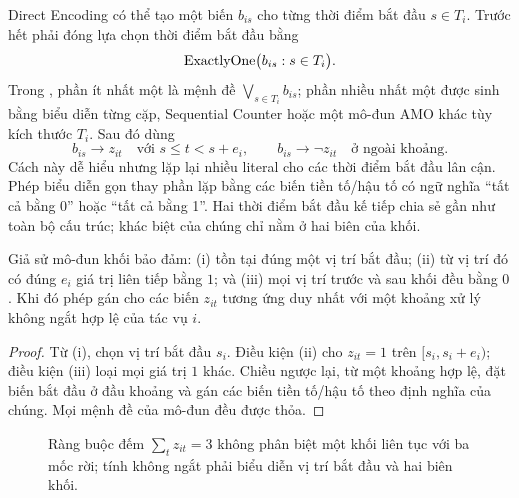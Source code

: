 Direct Encoding có thể tạo một biến \(b_{is}\) cho từng thời điểm bắt đầu
\(s\in T_i\). Trước hết phải đóng lựa chọn thời điểm bắt đầu bằng
\[
  \operatorname{ExactlyOne}\bigl(b_{is}:s\in T_i\bigr).
\]
Trong \CNF, phần ít nhất một là mệnh đề
\(\bigvee_{s\in T_i}b_{is}\); phần nhiều nhất một được sinh bằng biểu diễn từng
cặp, Sequential Counter hoặc một mô-đun AMO khác tùy kích thước \(T_i\). Sau đó
dùng
\[
  b_{is}\rightarrow z_{it}
  \quad\text{với }s\le t<s+e_i,
  \qquad
  b_{is}\rightarrow \neg z_{it}
  \quad\text{ở ngoài khoảng.}
\]
Cách này dễ hiểu nhưng lặp lại nhiều literal cho các thời điểm bắt đầu lân cận.
Phép biểu diễn gọn thay phần lặp bằng các biến tiền tố/hậu tố có ngữ nghĩa ``tất
cả bằng 0'' hoặc ``tất cả bằng 1''. Hai thời điểm bắt đầu kế tiếp chia sẻ gần
như toàn bộ cấu trúc; khác biệt của chúng chỉ nằm ở hai biên của khối.

\begin{proposition}
\label{prop:nonpreemptive-block}
Giả sử mô-đun khối bảo đảm: (i) tồn tại đúng một vị trí bắt đầu; (ii) từ vị
trí đó có đúng \(e_i\) giá trị liên tiếp bằng \(1\); và (iii) mọi vị trí trước
và sau khối đều bằng \(0\). Khi đó phép gán cho các biến \(z_{it}\) tương ứng
duy nhất với một khoảng xử lý không ngắt hợp lệ của tác vụ \(i\).
\end{proposition}

\begin{proof}
Từ (i), chọn vị trí bắt đầu \(s_i\). Điều kiện (ii) cho
\(z_{it}=1\) trên \([s_i,s_i+e_i)\); điều kiện (iii) loại mọi giá trị \(1\)
khác. Chiều ngược lại, từ một khoảng hợp lệ, đặt biến bắt đầu ở đầu khoảng và
gán các biến tiền tố/hậu tố theo định nghĩa của chúng. Mọi mệnh đề của mô-đun
đều được thỏa.
\end{proof}

\begin{figure}[tb]
\centering
{}
\caption{Ràng buộc đếm \(\sum_tz_{it}=3\) không phân biệt một khối liên tục với
ba mốc rời; tính không ngắt phải biểu diễn vị trí bắt đầu và hai biên khối.}
\label{fig:nonpreemptive-block}
\end{figure}

